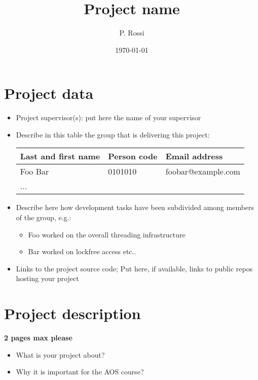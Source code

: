 \documentclass[10pt,a4]{article}
\author{P. Rossi}
\date{\today}
\title{Project name}
\begin{document}
\maketitle
\tableofcontents


\section{Project data}

\begin{itemize}
\item 
  Project supervisor(s): put here the name of your supervisor

\item 
Describe in this table the group that is delivering this project:

\begin{center}
\begin{tabular}{lll}
Last and first name & Person code & Email address\\
\hline
  Foo Bar & 0101010 & foobar@example.com \\
  ... & &                     
\end{tabular}
\end{center}

\item
Describe here how development tasks have been subdivided among members
of the group, e.g.:

\begin{itemize}
\item Foo worked on the overall threading infrastructure
\item Bar worked on lockfree access etc..
\end{itemize}

\item Links to the project source code; Put here, if available, links to public repos hosting your project 

\end{itemize}


\section{Project description}

\textbf{2 pages max please}

\begin{itemize}
\item What is your project about?
\item Why it is important for the AOS course?
\end{itemize}
\end{document}

